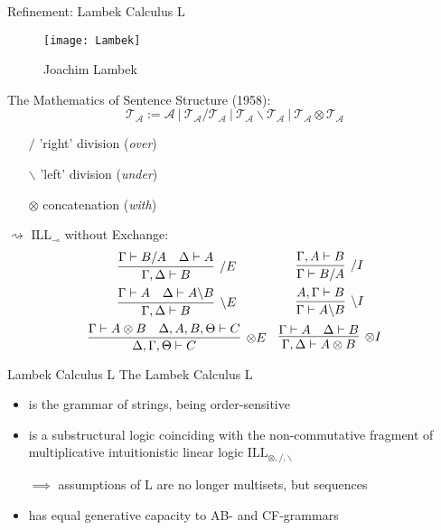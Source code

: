 \documentclass{beamer}
\newcommand{\li}{\!\multimap\!}
\begin{document}
\begin{frame}{Refinement: Lambek Calculus L}
	\small
	\begin{minipage}[t]{0.3\textwidth}
		\begin{figure}
		\texttt{[image: Lambek]}
		\caption{Joachim Lambek}
		\end{figure}	
	\end{minipage}%
	\begin{minipage}[t]{0.65\textwidth}
	\alert{The Mathematics of Sentence Structure (1958)}:
		\[
			\mathcal{T}_{\mathcal{A}} := \mathcal{A} \ | \ \mathcal{T}_\mathcal{A}/\mathcal{T}_\mathcal{A} \ | \ \mathcal{T}_\mathcal{A}\backslash \mathcal{T}_\mathcal{A} \ | \ \mathcal{T}_\mathcal{A}\otimes \mathcal{T}_\mathcal{A}
		\]
		\vspace{-20pt}
		\begin{itemize}
			\item[$/$] 'right' division (\textit{over})
			\item[$\backslash$] 'left' division (\textit{under})
			\item[$\otimes$] concatenation (\textit{with})
		\end{itemize}
	\end{minipage}
	\vfill
	\pause
	
	$\rightsquigarrow$ \alert{ILL${}_{\li}$ without Exchange}:
	\[
	\begin{array}{cc}
		\vcenter{\infer[/ E]{\Gamma, \Delta \vdash B}{\Gamma \vdash B/A & \Delta \vdash A}}
		&
		\vspace{5pt}
		\vcenter{\infer[/ I]{\Gamma \vdash B/A}{\Gamma, A \vdash B}} \\		\vcenter{\infer[\backslash E]{\Gamma, \Delta \vdash B}{\Gamma \vdash A & \Delta \vdash A\backslash B}}
		\vspace{5pt}
		&
		\vcenter{\infer[\backslash I]{\Gamma \vdash A\backslash B}{A, \Gamma \vdash B}} \\
		\vcenter{\infer[\otimes E]{\Delta, \Gamma, \Theta \vdash C}{
			\Gamma \vdash A\otimes B
			&
			\Delta, A, B, \Theta \vdash C
		}}
		&
		\vcenter{\infer[\otimes I]{\Gamma, \Delta \vdash A\otimes B}{
			\Gamma \vdash A 
			&
			\Delta \vdash B
			}} \\
	\end{array}
	\]
\end{frame}

\begin{frame}{Lambek Calculus L}
	\small
	\alert{The Lambek Calculus L}\\
	\begin{itemize}
	\item is the grammar of \alert{strings}, being order-sensitive
	\item is a substructural logic coinciding with the non-commutative fragment of multiplicative intuitionistic linear logic $\text{ILL}_{\otimes, /, \backslash}$
	\item[] $\implies$ assumptions of L are no longer multisets, but \alert{sequences}
	\item has equal generative capacity to AB- and CF-grammars
	\end{itemize}

\end{frame}
\end{document}
